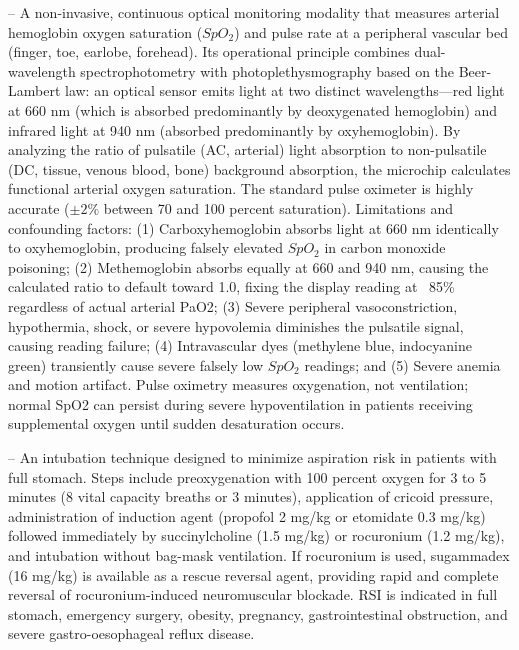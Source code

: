 -- A non-invasive, continuous optical monitoring modality that measures arterial hemoglobin oxygen saturation ($SpO_2$) and pulse rate at a peripheral vascular bed (finger, toe, earlobe, forehead). Its operational principle combines dual-wavelength spectrophotometry with photoplethysmography based on the Beer-Lambert law: an optical sensor emits light at two distinct wavelengths—red light at 660 nm (which is absorbed predominantly by deoxygenated hemoglobin) and infrared light at 940 nm (absorbed predominantly by oxyhemoglobin). By analyzing the ratio of pulsatile (AC, arterial) light absorption to non-pulsatile (DC, tissue, venous blood, bone) background absorption, the microchip calculates functional arterial oxygen saturation. The standard pulse oximeter is highly accurate ($\pm 2\%$ between 70 and 100 percent saturation). Limitations and confounding factors: (1) Carboxyhemoglobin absorbs light at 660 nm identically to oxyhemoglobin, producing falsely elevated $SpO_2$ in carbon monoxide poisoning; (2) Methemoglobin absorbs equally at 660 and 940 nm, causing the calculated ratio to default toward 1.0, fixing the display reading at ~85\% regardless of actual arterial PaO2; (3) Severe peripheral vasoconstriction, hypothermia, shock, or severe hypovolemia diminishes the pulsatile signal, causing reading failure; (4) Intravascular dyes (methylene blue, indocyanine green) transiently cause severe falsely low $SpO_2$ readings; and (5) Severe anemia and motion artifact. Pulse oximetry measures oxygenation, not ventilation; normal SpO2 can persist during severe hypoventilation in patients receiving supplemental oxygen until sudden desaturation occurs.

-- An intubation technique designed to minimize aspiration risk in patients with full stomach. Steps include preoxygenation with 100 percent oxygen for 3 to 5 minutes (8 vital capacity breaths or 3 minutes), application of cricoid pressure, administration of induction agent (propofol 2 mg/kg or etomidate 0.3 mg/kg) followed immediately by succinylcholine (1.5 mg/kg) or rocuronium (1.2 mg/kg), and intubation without bag-mask ventilation. If rocuronium is used, sugammadex (16 mg/kg) is available as a rescue reversal agent, providing rapid and complete reversal of rocuronium-induced neuromuscular blockade. RSI is indicated in full stomach, emergency surgery, obesity, pregnancy, gastrointestinal obstruction, and severe gastro-oesophageal reflux disease.

